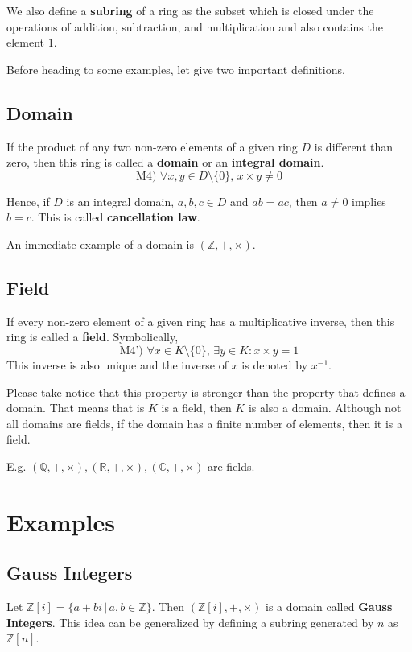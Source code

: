 \documentclass[12pt,a4paper]{article}
\theoremstyle{definition}
\begin{document}
We also define a \textbf{subring} of a ring as the subset which is closed under the operations of addition, subtraction, and multiplication and also contains the element $1$.

Before heading to some examples, let give two important definitions.

\subsection{Domain}\label{domain}

If the product of any two non-zero elements of a given ring \(D\) is different than zero, then this ring is called a \textbf{domain} or an \textbf{integral domain}.
\[\text{M4) } \forall x, y \in D \setminus \{ 0 \}, \, x \times y \neq 0\]

Hence, if $D$ is an integral domain, $a,b,c \in D$ and $ab = ac$, then $a \neq 0$ implies $b=c$. This is called \textbf{cancellation law}.

An immediate example of a domain is $(\mathbb{Z}, +, \times)$.

\subsection{Field}\label{field}

If every non-zero element of a given ring has a multiplicative inverse, then this ring is called a \textbf{field}. Symbolically,
\[\text{M4') }\forall x \in K \setminus \{0 \}, \, \exists y \in K : x \times y = 1\]
This inverse is also unique and the inverse of $x$ is denoted by $x^{-1}$.

Please take notice that this property is stronger than the property that defines a domain. That means that is \(K\) is a field, then \(K\) is also a domain. Although not all domains are fields, if the domain has a finite number of elements, then it is a field.

E.g. \((\mathbb{Q},+,\times), (\mathbb{R},+,\times), (\mathbb{C},+,\times)\) are fields.

\section{Examples}

\subsection{Gauss Integers}

Let \(\mathbb{Z}[i] = \{ a+ bi \, |  \, a,b \in \mathbb{Z} \}\). Then \((\mathbb{Z}[i], +, \times)\) is a domain called \textbf{Gauss Integers}. This idea can be generalized by defining a subring generated by $n$ as $\mathbb{Z}[n]$.
\end{document}
